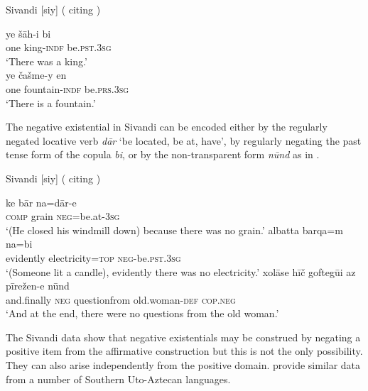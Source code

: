 \documentclass[output=paper,chinesefont,colorlinks,citecolor=brown]{langscibook}
\begin{document}
\begin{exe}
\ex Sivandi [siy] ( citing \citet{Lecoq1979}) \label{ex:sivandi1}
\begin{xlist}
\ex \label{ex:sivandi1a}
\gll ye šāh-i bi\\
one  king-\textsc{indf} be.\textsc{pst}.\textsc{3sg} \\
\glt `There was a king.' \citep[107]{Lecoq1979}\\
\ex \label{ex:sivandi1b}
\gll ye čašme-y en \\
one fountain-\textsc{indf} be.\textsc{prs.3sg} \\
\glt `There is a fountain.' \citep[127]{Lecoq1979}\\
\end{xlist}
\end{exe}
The negative existential in Sivandi can be encoded either by the regularly negated locative verb \textit{dār}  ‘be located, be at, have’,  by regularly negating the past tense form of the copula \textit{bi}, or by the non-transparent form \textit{nūnd} as in .

\newpage
\begin{exe}
\ex Sivandi [siy] ( citing \citet{Lecoq1979}) \label{ex:sivandi2}
\begin{xlist}
\ex \label{ex:sivandi2a}
\gll ke bār na=dār-e \\
\textsc{comp} grain \textsc{neg}=be.at-\textsc{3sg} \\
\glt `(He closed his windmill down) because there was no grain.' \citep[150]{Lecoq1979}
\ex \label{ex:sivandi2b}
\gll albatta barqa=m na=bi \\
evidently electricity=\textsc{top} \textsc{neg}-be.\textsc{pst.3sg} \\
\glt `(Someone lit a candle), evidently there was no electricity.' \citep[89]{Lecoq1979}
\ex \label{ex:sivandi2c}
\gll xolāse hīč goftegūi az pīrežen-e  nūnd \\
and.finally \textsc{neg} questionfrom  old.woman-\textsc{def} \textsc{cop.neg} \\
\glt `And at the end, there were no questions from the old woman.' \citep[108]{Lecoq1979}
\end{xlist}
\end{exe}
The Sivandi data show that negative existentials may be construed by negating a positive item from the affirmative construction but this is not the only possibility. They can also arise independently from the positive domain.  provide similar data from a number of Southern Uto-Aztecan languages.
\end{document}
